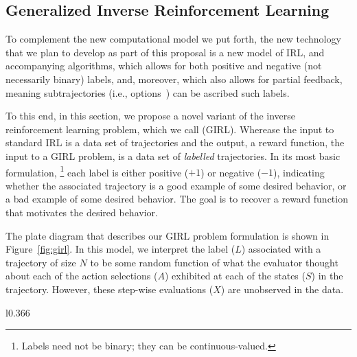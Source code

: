 
\subsection{Generalized Inverse Reinforcement Learning}
\label{sec:girl}

To complement the new computational model we put forth, the new
technology that we plan to develop as part of this proposal is a new
model of IRL, and accompanying algorithms, which allows for both
positive and negative (not necessarily binary) labels, and, moreover,
which also allows for partial feedback, meaning subtrajectories (i.e.,
options~\cite{sutton99}) can be ascribed such labels.

To this end, in this section, we propose a novel variant of the
inverse reinforcement learning problem, which we call
 (GIRL).  Wherease the input to standard IRL is
a data set of trajectories
and the output, a reward function, the input to a GIRL problem, is a
data set of \emph{labelled\/} trajectories. 
In its most basic formulation,%
\footnote{Labels need not be binary; they can be continuous-valued.}
each label is either positive ($+1$) or negative ($-1$), indicating
whether the associated trajectory is a good example of some desired
behavior, or a bad example of some desired behavior.  The goal is to
recover a reward function that motivates the desired behavior.

The plate diagram that describes our GIRL problem formulation is shown
in Figure~\ref{fig:girl}.  In this model, we interpret the label ($L$)
associated with a trajectory of size $N$ to be some random function of
what the evaluator thought about each of the action selections ($A$)
exhibited at each of the states ($S$) in the trajectory.  However,
these step-wise evaluations ($X$) are unobserved in the data.

\begin{wrapfigure}{l}{0.366\textwidth}
\caption{Generalized IRL}
\label{fig:girl}
\end{wrapfigure}

